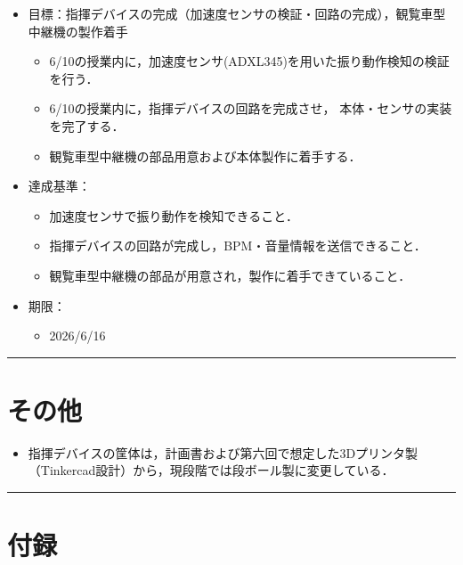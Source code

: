 \documentclass[uplatex,dvipdfmx,a4paper,11pt]{jsarticle}
\newcommand{\sectionrule}{\par\medskip\noindent\rule{\linewidth}{0.6pt}\par\medskip}
\begin{document}
\begin{itemize}

  \item 目標：指揮デバイスの完成（加速度センサの検証・回路の完成），観覧車型中継機の製作着手
    \begin{itemize}
      \item 6/10の授業内に，加速度センサ(ADXL345)を用いた振り動作検知の検証を行う．

      \item 6/10の授業内に，指揮デバイスの回路を完成させ，
      本体・センサの実装を完了する．

      \item 観覧車型中継機の部品用意および本体製作に着手する．
    \end{itemize}

  \item 達成基準：
    \begin{itemize}
      \item 加速度センサで振り動作を検知できること．

      \item 指揮デバイスの回路が完成し，BPM・音量情報を送信できること．

      \item 観覧車型中継機の部品が用意され，製作に着手できていること．
    \end{itemize}

  \item 期限：
    \begin{itemize}
      \item 2026/6/16
    \end{itemize}

\end{itemize}


\sectionrule


\section{その他}

\begin{itemize}
  \item {}指揮デバイスの筐体は，計画書および第六回で想定した3Dプリンタ製（Tinkercad設計）から，現段階では段ボール製に変更している．
\end{itemize}

\sectionrule


\section{付録}
\end{document}
